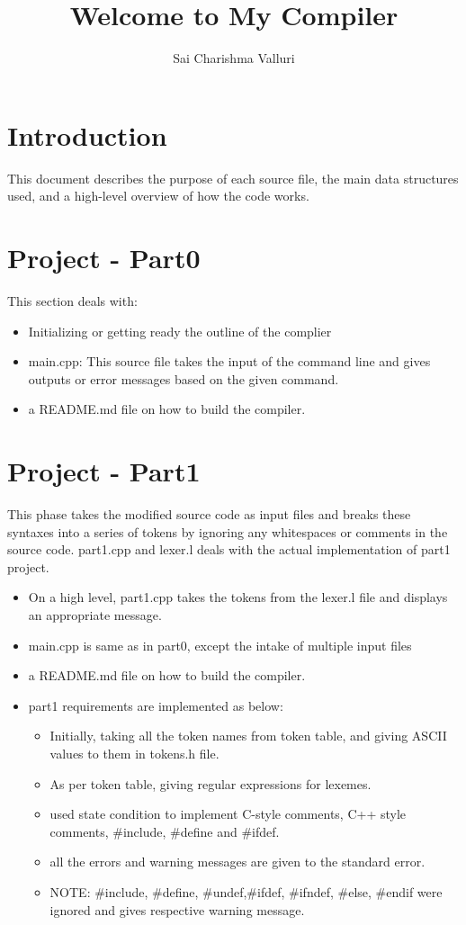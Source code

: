 \documentclass{article}
\title{Welcome to My Compiler}
\author{Sai Charishma Valluri}
\begin{document}
\maketitle

\section{Introduction}
This document describes the purpose of each source file, the main data structures used, 
and a high-level overview of how the code works.

\section{Project - Part0}
This section deals with:
\begin{itemize}
  \item Initializing or getting ready the outline of the complier

  \item main.cpp: This source file takes the input of the command line and gives outputs 
  	or error messages based on the given command.
	
  \item a README.md file on how to build the compiler.

\end{itemize}

\section{Project - Part1}
This phase takes the modified source code as input files and breaks these syntaxes 
into a series of tokens by ignoring any whitespaces or comments in the source code.
\newline part1.cpp and lexer.l deals with the actual implementation of part1 project.
\begin{itemize}
  \item On a high level, part1.cpp takes the tokens from the lexer.l file and displays an appropriate message.
  \item main.cpp is same as in part0, except the intake of multiple input files 
  \item a README.md file on how to build the compiler.
  \item part1 requirements are implemented as below:
  \begin{itemize}
    \item Initially, taking all the token names from token table, and giving ASCII values to them in tokens.h file.
    \item As per token table, giving regular expressions for lexemes.
    \item used state condition to implement C-style comments, C++ style comments, \#include, \#define and \#ifdef.
    \item all the errors and warning messages are given to the standard error.
    \item NOTE: \#include, \#define, \#undef,\#ifdef, \#ifndef, \#else, \#endif were ignored and gives respective warning message.
  \end{itemize}
\end{itemize}
\end{document}
